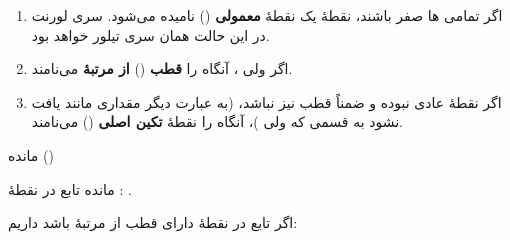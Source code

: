 \begin{EMunit}

\begin{enumerate}
\def\labelenumi{\arabic{enumi}.}
\tightlist
\item
  اگر تمامی  ها صفر باشند، نقطهٔ  یک نقطهٔ \textbf{معمولی} () نامیده می‌شود. سری لورنت در این حالت همان سری تیلور خواهد بود.
\item
  اگر  ولی ، آنگاه  را \textbf{قطب} () \textbf{از مرتبهٔ } می‌نامند.
\item
  اگر  نقطهٔ عادی نبوده و ضمناً قطب نیز نباشد، (به عبارت دیگر مقداری مانند  یافت نشود به قسمی که  ولی )، آنگاه  را نقطهٔ \textbf{تکین اصلی} () می‌نامند.
\end{enumerate}

\end{EMunit}

\EMhold


\begin{EMdefinition}{مانده ()}

مانده تابع  در نقطهٔ : .

\end{EMdefinition}

\begin{EMtheorem}{}

اگر تابع  در نقطهٔ  دارای قطب از مرتبهٔ  باشد داریم:

\end{EMtheorem}


